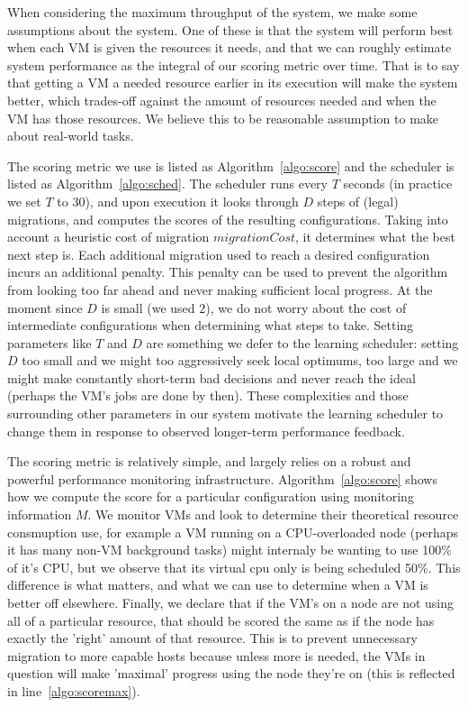 When considering the maximum throughput of the system, we make some assumptions
about the system.  One of these is that the system will perform best when each
VM is given the resources it needs, and that we can roughly estimate
system performance as the integral of our scoring metric over time.  That is to
say that getting a VM a needed resource earlier in its execution will
make the system better, which trades-off against the amount of resources
needed and when the VM has those resources.  We believe this to be reasonable assumption to make
about real-world tasks.



The scoring metric we use is listed as Algorithm~\ref{algo:score} and the scheduler is
listed as Algorithm~\ref{algo:sched}.  The scheduler runs every $T$ seconds (in
practice we set $T$ to 30), and upon execution it looks through $D$ steps of
(legal) migrations, and computes the scores of the resulting configurations.
Taking into account a heuristic cost of migration $migrationCost$, it determines
what the best next step is.  Each additional migration used to reach a desired
configuration incurs an additional penalty.   This penalty can be used to
prevent the algorithm from looking too far ahead and never making sufficient
local progress.  At the moment since $D$ is small (we used $2$), we do not worry
about the cost of intermediate configurations when determining what steps to
take.  Setting parameters like $T$ and $D$ are something we defer to the
learning scheduler: setting $D$ too small and we might too aggressively seek
local optimums, too large and we might make constantly short-term bad decisions
and never reach the ideal (perhaps the VM's jobs are done by then).  These
complexities and those surrounding other parameters in our system motivate the
learning scheduler to change them in response to observed longer-term
performance feedback.

The scoring metric is relatively simple, and largely relies on a robust and
powerful performance monitoring infrastructure.  Algorithm~\ref{algo:score}
shows how we compute the score for a particular configuration using monitoring
information $M$.  We monitor VMs and look to determine their theoretical
resource consmuption use, for example a VM running on a CPU-overloaded
node (perhaps it has many non-VM background tasks) might internaly be wanting to
use 100\% of it's CPU, but we observe that its virtual cpu only is being
scheduled 50\%.  This difference is what matters, and what we can use to
determine when a VM is better off elsewhere.  Finally, we declare
that if the VM's on a node are not using all of a particular resource, that
should be scored the same as if the node has exactly the 'right' amount of that
resource.  This is to prevent unnecessary migration to more capable hosts
because unless more is needed, the VMs in question will make 'maximal'
progress using the node they're on (this is reflected in
line~\ref{algo:scoremax}).

